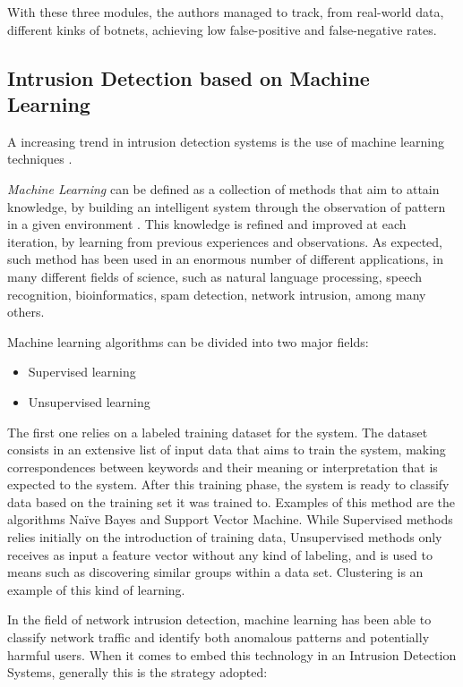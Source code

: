 \documentclass[runningheads,a4paper]{llncs}
\begin{document}
With these three modules, the authors managed to track, from real-world data, different kinks of botnets, achieving low false-positive and false-negative rates. 

\subsection{Intrusion Detection based on Machine Learning}\label{ssec:mlearning}
A increasing trend in intrusion detection systems is the use of machine learning techniques \cite{Pitts2014, Sperotto2010}.

\emph{Machine Learning} can be defined as a collection of methods that aim to attain knowledge, by building an intelligent system through the observation of pattern in a given environment \cite{Pitts2014}. This knowledge is refined and improved at each iteration, by learning from previous experiences and observations. As expected, such method has been used in an enormous number of different applications, in many different fields of science, such as natural language processing, speech recognition, bioinformatics, spam detection, network intrusion, among many others. 

Machine learning algorithms can be divided into two major fields:

\begin{itemize}
\item Supervised learning
\item Unsupervised learning
\end{itemize}

The first one relies on a labeled training dataset for the system. The dataset consists in an extensive list of input data that aims to train the system, making correspondences between keywords and their meaning or interpretation that is expected to the system. After this training phase, the system is ready to classify data based on the training set it was trained to. Examples of this method are the algorithms Na\"{i}ve Bayes and Support Vector Machine. While Supervised methods relies initially on the introduction of training data, Unsupervised methods only receives as input a feature vector without any kind of labeling, and is used to means such as discovering similar groups within a data set. Clustering is an example of this kind of learning. 

In the field of network intrusion detection, machine learning has been able to classify network traffic and identify both anomalous patterns and potentially harmful users. When it comes to embed this technology in an Intrusion Detection Systems, generally this is the strategy adopted:
\end{document}
